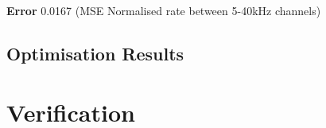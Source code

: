 \textbf{Error} 0.0167  (MSE Normalised rate between 5-40kHz channels)



\subsection{Optimisation Results}


\section{Verification}





